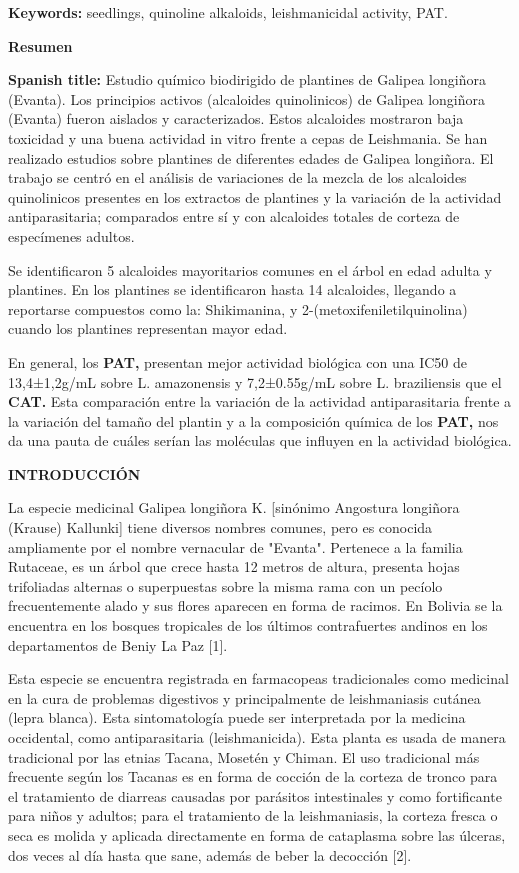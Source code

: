 \documentclass{article}
\begin{document}
\textbf{Keywords: }
seedlings, quinoline alkaloids, leishmanicidal activity, PAT.

\textbf{Resumen}

\textbf{Spanish title: }
Estudio químico biodirigido de plantines de Galipea longiñora (Evanta). Los
principios activos (alcaloides quinolinicos) de Galipea longiñora (Evanta)
fueron aislados y caracterizados. Estos alcaloides mostraron baja toxicidad y
una buena actividad in vitro frente a cepas de Leishmania. Se han realizado
estudios sobre plantines de diferentes edades de Galipea longiñora. El trabajo
se centró en el análisis de variaciones de la mezcla de los alcaloides
quinolinicos presentes en los extractos de plantines y la variación de la
actividad antiparasitaria; comparados entre sí y con alcaloides totales de
corteza de especímenes adultos.

Se identificaron 5 alcaloides mayoritarios comunes en el árbol en edad adulta y
plantines. En los plantines se identificaron hasta 14 alcaloides, llegando a
reportarse compuestos como la: Shikimanina, y 2-(metoxifeniletilquinolina)
cuando los plantines representan mayor edad.

En general, los \textbf{PAT, }
presentan mejor actividad biológica con una IC50 de 13,4±1,2g/mL sobre L.
amazonensis y 7,2±0.55g/mL sobre L. braziliensis que el \textbf{CAT. }
Esta comparación entre la variación de la actividad antiparasitaria frente a la
variación del tamaño del plantin y a la composición química de los \textbf{PAT,
}
nos da una pauta de cuáles serían las moléculas que influyen en la actividad
biológica.

\textbf{INTRODUCCIÓN}

La especie medicinal Galipea longiñora K. [sinónimo Angostura longiñora (Krause)
Kallunki] tiene diversos nombres comunes, pero es conocida ampliamente por el
nombre vernacular de "Evanta". Pertenece a la familia Rutaceae, es un árbol que
crece hasta 12 metros de altura, presenta hojas trifoliadas alternas o
superpuestas sobre la misma rama con un pecíolo frecuentemente alado y sus
flores aparecen en forma de racimos. En Bolivia se la encuentra en los bosques
tropicales de los últimos contrafuertes andinos en los departamentos de Beniy La
Paz [1].

Esta especie se encuentra registrada en farmacopeas tradicionales como medicinal
en la cura de problemas digestivos y principalmente de leishmaniasis cutánea
(lepra blanca). Esta sintomatología puede ser interpretada por la medicina
occidental, como antiparasitaria (leishmanicida). Esta planta es usada de manera
tradicional por las etnias Tacana, Mosetén y Chiman. El uso tradicional más
frecuente según los Tacanas es en forma de cocción de la corteza de tronco para
el tratamiento de diarreas causadas por parásitos intestinales y como
fortificante para niños y adultos; para el tratamiento de la leishmaniasis, la
corteza fresca o seca es molida y aplicada directamente en forma de cataplasma
sobre las úlceras, dos veces al día hasta que sane, además de beber la decocción
[2].
\end{document}
